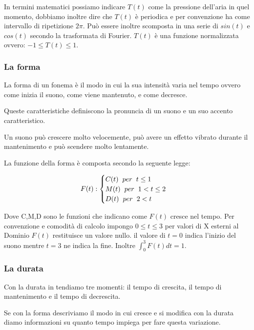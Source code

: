 \documentclass{article}
\begin{document}
In termini matematici possiamo indicare $T(t)$ come la pressione dell'aria in quel momento, dobbiamo inoltre dire che $T(t)$ è periodica e per convenzione ha come intervallo di ripetizione $2\pi$. Può essere inoltre scomposta in una serie di $sin(t)$ e $cos(t)$ secondo la trasformata di Fourier. $T(t)$ è una funzione normalizzata ovvero: $-1 \le T(t) \le 1$.

\subsubsection{La forma}
La forma di un fonema è il modo in cui la sua intensità varia nel tempo ovvero come inizia il suono, come viene mantenuto, e come decresce.

Queste caratteristiche definiscono la pronuncia di un suono e un suo accento caratteristico.

Un suono può crescere molto velocemente, può avere un effetto vibrato durante il mantenimento e può scendere molto lentamente.

La funzione della forma è composta secondo la seguente legge:

$$F(t) :
\begin{cases}
	C(t)\hspace{0.2cm}per\hspace{0.2cm}t \le 1 \\
	M(t)\hspace{0.2cm}per\hspace{0.2cm}1 < t \le 2\\
	D(t)\hspace{0.2cm}per\hspace{0.2cm}2 < t
\end{cases}
$$

Dove C,M,D sono le funzioni che indicano come $F(t)$ cresce nel tempo. Per convenzione e comodità di calcolo impongo $0 \le t \le 3$ per valori di X esterni al Dominio $F(t)$ restituisce un valore nullo. il valore di $t = 0$ indica l'inizio del suono mentre $t = 3$ ne indica la fine. Inoltre $\int_0^3F(t)dt = 1$.

\subsubsection{La durata}
Con la durata in tendiamo tre momenti: il tempo di crescita, il tempo di mantenimento e il tempo di decrescita.

Se con la forma descriviamo il modo in cui cresce e si modifica con la durata diamo informazioni su quanto tempo impiega per fare questa variazione.
\end{document}
